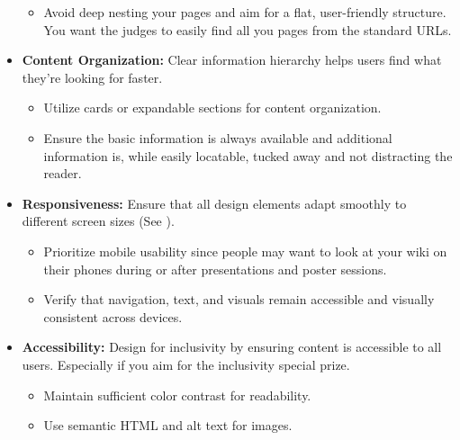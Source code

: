\begin{itemize}
\begin{itemize}
        \item Avoid deep nesting your pages and aim for a flat, user-friendly structure.
        You want the judges to easily find all you pages from the standard URLs.
    \end{itemize}
    \item \textbf{Content Organization:} Clear information hierarchy helps users find what they’re looking for faster.
    \begin{itemize}
        \item Utilize cards or expandable sections for content organization.
        \item Ensure the basic information is always available and additional information is, while easily locatable, tucked away and not distracting the reader.
    \end{itemize}
\end{itemize}
\begin{itemize}
    \item \textbf{Responsiveness:} Ensure that all design elements adapt smoothly to different screen sizes (See ).
    \begin{itemize}
        \item Prioritize mobile usability since people may want to look at your wiki on their phones during or after presentations and poster sessions.
        \item Verify that navigation, text, and visuals remain accessible and visually consistent across devices.
    \end{itemize}
    \item \textbf{Accessibility:} Design for inclusivity by ensuring content is accessible to all users.
    Especially if you aim for the inclusivity special prize. 
    \begin{itemize}
        \item Maintain sufficient color contrast for readability.
        \item Use semantic HTML and alt text for images.
    \end{itemize}
\end{itemize}
